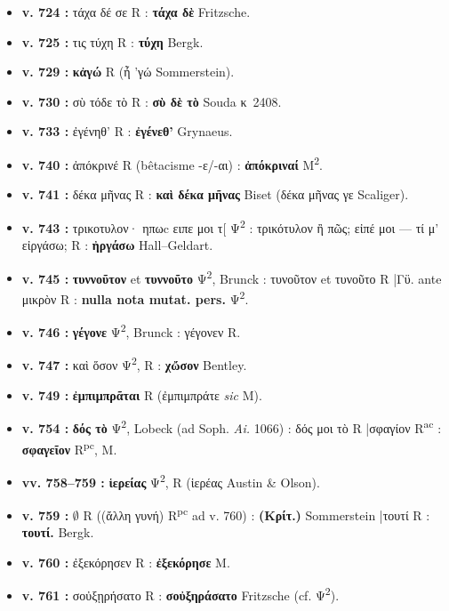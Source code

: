\documentclass[10pt, a4paper, twoside]{book}
\renewcommand{\_}{\origunderscore\penalty0\relax}
\providecommand{\italique}[1]{\emph{#1}}
\providecommand{\lecon}[1]{\textbf{#1}}
\providecommand{\expo}[1]{\textsuperscript{#1}}
\providecommand{\Rac}{R\expo{ac}}
\providecommand{\Rpc}{R\expo{pc}}
\providecommand{\Mon}{M}
\providecommand{\PsiDeux}{\textgreek{Ψ}\textsuperscript{2}}
\providecommand{\espApp}{\hspace{0.5em}|\hspace{0.5em}}
\begin{document}
\begin{itemize}
\begin{itemize}
    \item \textbf{v. 724 :} τάχα δέ σε R : \lecon{τάχα δὲ} Fritzsche.
    \item \textbf{v. 725 :} τις τύχη R : \lecon{τύχη} Bergk.
    \item \textbf{v. 729 :} \lecon{κἀγώ} R (ἦ 'γώ Sommerstein).
    \item \textbf{v. 730 :} σὺ τόδε τὸ R : \lecon{σὺ δὲ τὸ} Souda κ~2408.
    \item \textbf{v. 733 :} ἐγένηθ' R : \lecon{ἐγένεθ'} Grynaeus.
    \item \textbf{v. 740 :} ἀπόκρινέ R (bêtacisme -ε/-αι) : \lecon{ἀπόκριναί} \Mon{}\expo{2}.
    \item \textbf{v. 741 :} δέκα μῆνας R : \lecon{καὶ δέκα μῆνας} Biset (δέκα μῆνας γε Scaliger).
    \item \textbf{v. 743 :} \_τρικοτυλον· ηπωc  ειπε μοι τ[ \PsiDeux{} : τρικότυλον ἢ πῶς; εἰπέ μοι — τί μ' εἰργάσω; R : \lecon{ἠργάσω} Hall–Geldart.
    \item \textbf{v. 745 :} \lecon{τυννοῦτον} et \lecon{τυννοῦτο} \PsiDeux{}, Brunck : τυνοῦτον et τυνοῦτο R \espApp Γϋ. ante μικρὸν R : \lecon{nulla nota mutat. pers.} \PsiDeux{}.
    \item \textbf{v. 746 :} \lecon{γέγονε} \PsiDeux{}, Brunck : γέγονεν R.
    \item \textbf{v. 747 :} καὶ ὅσον \PsiDeux{}, R : \lecon{χὤσον} Bentley.
    \item \textbf{v. 749 :} \lecon{ἐμπιμπρᾶται} R (ἐμπιμπράτε \italique{sic} \Mon{}).
    \item \textbf{v. 754 :} \lecon{δός τὸ} \PsiDeux{}, Lobeck (ad Soph. \italique{Ai.} 1066) : δός μοι τὸ R \espApp σφαγίον \Rac{} : \lecon{σφαγεῖον} \Rpc{}, \Mon{}.
    \item \textbf{vv. 758–759 :} \lecon{ἱερείας} \PsiDeux{}, R (ἱερέας Austin \& Olson).
    \item \textbf{v. 759 :} $\emptyset$ R ((ἄλλη γυνή) \Rpc{} ad v. 760) : \lecon{(Κρίτ.)} Sommerstein \espApp τουτί R : \lecon{τουτί.} Bergk.
    \item \textbf{v. 760 :} ἐξεκόρησεν R : \lecon{ἐξεκόρησε} \Mon{}.
    \item \textbf{v. 761 :} σοὐξῃρήσατο R : \lecon{σοὐξηράσατο} Fritzsche (cf. \PsiDeux{}).
  \end{itemize}
\end{itemize}
\end{document}
